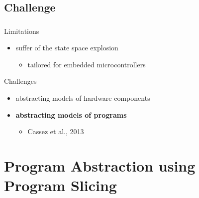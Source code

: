 \documentclass{beamer}
\begin{document}
  \subsection{Challenge}
  \begin{frame}
    \frametitle{\secname}
    \framesubtitle{\subsecname}
      
    \begin{block}{Limitations}
      \begin{itemize}
      \item suffer of the state space explosion
        \begin{itemize}
        \item tailored for embedded microcontrollers %
          \end{itemize}
      \end{itemize}
    \end{block}
    
    \vspace{1em}
    \begin{block}{Challenges}
      \begin{itemize}
        \item abstracting models of hardware components~\cite{CGM15}
        \item \textbf{abstracting models of programs}~\cite{BJ14,CB13,MBB16}
          \begin{itemize}
            \item Cassez et al., 2013
          \end{itemize}
      \end{itemize}
    \end{block}
  \end{frame}


  \section{Program Abstraction using Program Slicing}
  \begin{frame}
    \frametitle{\secname}
    \tableofcontents[currentsection]
  \end{frame}
\end{document}
